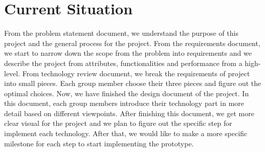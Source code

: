 \section{Current Situation}
From the problem statement document, we understand the purpose of this project and the general process for the project. From the requirements document, we start to narrow down the scope from the problem into requirements and we describe the project from attributes, functionalities and performance from a high-level. From technology review document, we break the requirements of project into small pieces. Each group member choose their three pieces and figure out the optimal choices. Now, we have finished the design document of the project. In this document, each group members introduce their technology part in more detail based on different viewpoints. After finishing this document, we get more clear visual for the project and we plan to figure out the specific step for implement each technology. After that, we would like to make a more specific milestone for each step to start implementing the prototype.

